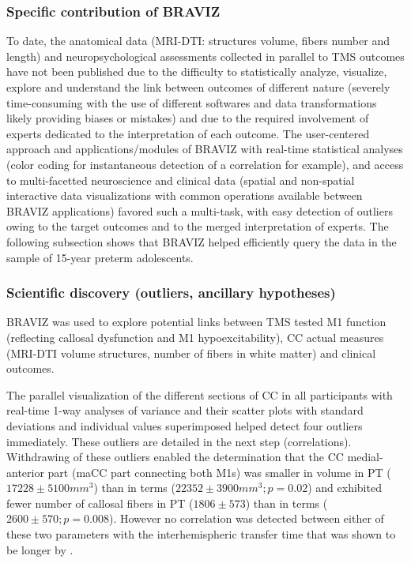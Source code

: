 \documentclass[twocolumn]{svjour3}
\begin{document}
\subsubsection{Specific contribution of BRAVIZ}

To date, the anatomical data (MRI-DTI: structures volume, fibers number and length) and neuropsychological assessments collected in parallel to TMS outcomes have not been published due to the difficulty to statistically analyze, visualize, explore and understand the link between outcomes of different nature (severely time-consuming with the use of different softwares and data transformations likely providing biases or mistakes) and due to the required involvement of experts dedicated to the interpretation of each outcome. The user-centered approach and applications/modules of BRAVIZ with real-time statistical analyses (color coding for instantaneous detection of a correlation for example), and access to multi-facetted neuroscience and clinical data (spatial and non-spatial interactive data visualizations with common operations available between BRAVIZ applications) favored such a multi-task, with easy detection of outliers owing to the target outcomes and to the merged interpretation of experts. The following subsection shows that BRAVIZ helped efficiently query the data in the sample of 15-year preterm adolescents.

\subsubsection{Scientific discovery (outliers, ancillary hypotheses)}

BRAVIZ was used to explore potential links between TMS tested M1 function (reflecting callosal dysfunction and M1 hypoexcitability), CC actual measures (MRI-DTI volume structures, number of fibers in white matter) and clinical outcomes. 

The parallel visualization of the different sections of CC in all participants with real-time 1-way analyses of variance and their scatter plots with standard deviations and individual values superimposed helped detect four outliers immediately. These outliers are detailed in the next step (correlations). Withdrawing of these outliers enabled the determination that the CC medial-anterior part (maCC part connecting both M1s) was smaller in volume in PT ($17228 \pm 5100 mm^3$) than in terms ($22352 \pm 3900 mm^3; p=0.02$) and exhibited fewer number of callosal fibers in PT ($1806 \pm 573$) than in terms ($2600 \pm 570; p=0.008$). However no correlation was detected between either of these two parameters with the interhemispheric transfer time that was shown to be longer by \cite{schneider_cerebral_2012}. 
\end{document}
